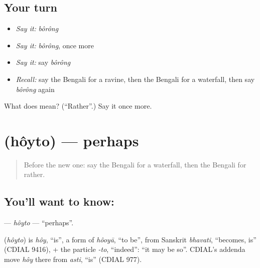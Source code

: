 \subsection*{Your turn}
\begin{itemize}
\raggedright
  \item \emph{Say it:} \emph{bôrông}
  \item \emph{Say it:} \emph{bôrông}, once more
  \item \emph{Say it:} say \emph{bôrông}
  \item \emph{Recall:} say the Bengali for a ravine, then the Bengali for a waterfall, then say \emph{bôrông} again
\end{itemize}

\begin{tcolorbox}[breakable,colback=teal!4,colframe=teal!35!black,title={Before you move on}]
What does  mean? (\textquotedblleft{}Rather\textquotedblright{}.) Say it once more.
\end{tcolorbox}
\section[\texorpdfstring{\bn{হয়তো} (hôyto)}{হয়তো (hôyto)}]{ (hôyto) — perhaps}

\label{lesson:BN-C190-hoyto}



\begin{quote}
Before the new one: say the Bengali for a waterfall, then the Bengali for rather.
\end{quote}

\subsection*{You'll want to know: }
\textbf{} — \emph{hôyto} — \textquotedblleft{}perhaps\textquotedblright{}.

\begin{cousinweb}
\textbf{} (\emph{hôyto}) is \emph{hôy}, \textquotedblleft{}is\textquotedblright{}, a form of \emph{hôoyā}, \textquotedblleft{}to be\textquotedblright{}, from Sanskrit \emph{bhavati}, \textquotedblleft{}becomes, is\textquotedblright{} (CDIAL 9416), + the particle \emph{-to}, \textquotedblleft{}indeed\textquotedblright{}: \textquotedblleft{}it may be so\textquotedblright{}. CDIAL's addenda move \emph{hôy} there from \emph{asti}, \textquotedblleft{}is\textquotedblright{} (CDIAL 977).
\end{cousinweb}

